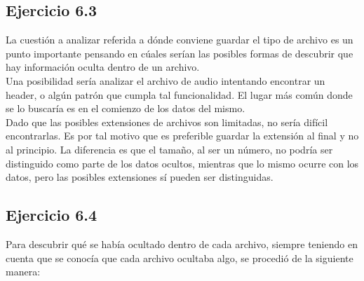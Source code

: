 \documentclass{article}
\begin{document}
\subsection{Ejercicio 6.3}

\noindent La cuestión a analizar referida a dónde conviene guardar el tipo de archivo es un punto importante pensando en cúales serían las posibles formas de descubrir que hay información oculta dentro de un archivo.\\
Una posibilidad sería analizar el archivo de audio intentando encontrar un header, o algún patrón que cumpla tal funcionalidad. El lugar más común donde se lo buscaría es en el comienzo de los datos del mismo.\\
Dado que las posibles extensiones de archivos son limitadas, no sería difícil encontrarlas. Es por tal motivo que es preferible guardar la extensión al final y no al principio. La diferencia es que el tamaño, al ser un número, no podría ser distinguido como parte de los datos ocultos, mientras que lo mismo ocurre con los datos, pero las posibles extensiones sí pueden ser distinguidas.

\subsection{Ejercicio 6.4}

\noindent Para descubrir qué se había ocultado dentro de cada archivo, siempre teniendo en cuenta que se conocía que cada archivo ocultaba algo, se procedió de la siguiente manera:\\
\end{document}
